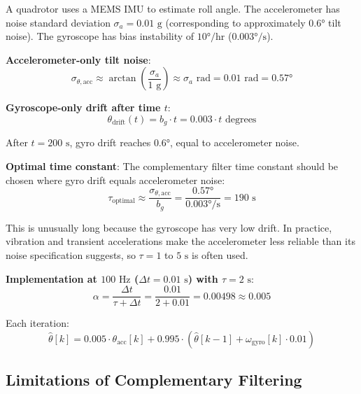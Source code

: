 \begin{example}
\label{ex:complementary_filter}

A quadrotor uses a MEMS IMU to estimate roll angle. The accelerometer has noise standard deviation $\sigma_a = 0.01\text{ g}$ (corresponding to approximately $0.6°$ tilt noise). The gyroscope has bias instability of $10°/\text{hr}$ ($0.003°/\text{s}$).

\textbf{Accelerometer-only tilt noise}:
\begin{equation}
\sigma_{\theta,\text{acc}} \approx \arctan\left(\frac{\sigma_a}{1\text{ g}}\right) \approx \sigma_a \text{ rad} = 0.01 \text{ rad} = 0.57°
\end{equation}

\textbf{Gyroscope-only drift after time $t$}:
\begin{equation}
\theta_{\text{drift}}(t) = b_g \cdot t = 0.003 \cdot t \text{ degrees}
\end{equation}

After $t = 200\text{ s}$, gyro drift reaches $0.6°$, equal to accelerometer noise.

\textbf{Optimal time constant}: The complementary filter time constant should be chosen where gyro drift equals accelerometer noise:
\begin{equation}
\tau_{\text{optimal}} \approx \frac{\sigma_{\theta,\text{acc}}}{b_g} = \frac{0.57°}{0.003°/\text{s}} = 190\text{ s}
\end{equation}

This is unusually long because the gyroscope has very low drift. In practice, vibration and transient accelerations make the accelerometer less reliable than its noise specification suggests, so $\tau = 1$ to $5\text{ s}$ is often used.

\textbf{Implementation at $100\text{ Hz}$ ($\Delta t = 0.01\text{ s}$) with $\tau = 2\text{ s}$}:
\begin{equation}
\alpha = \frac{\Delta t}{\tau + \Delta t} = \frac{0.01}{2 + 0.01} = 0.00498 \approx 0.005
\end{equation}

Each iteration:
\begin{equation}
\hat{\theta}[k] = 0.005 \cdot \theta_{\text{acc}}[k] + 0.995 \cdot \left(\hat{\theta}[k-1] + \omega_{\text{gyro}}[k] \cdot 0.01\right)
\end{equation}
\end{example}

\subsection{Limitations of Complementary Filtering}

